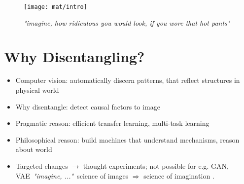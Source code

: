 \begin{figure}[t] \centering \texttt{[image: mat/intro]} \caption{\textit{"imagine, how ridiculous you would look, if you wore that hot pants"}} \label{fig:x4} \end{figure}

\section*{Why Disentangling?} \begin{itemize} \item Computer vision: automatically discern patterns, that reflect structures in physical world \item Why disentangle: detect causal factors to image \item Pragmatic reason: efficient transfer learning, multi-task learning \item Philosophical reason: build machines that understand mechanisms, reason about world \cite{Pearl:2018im} \item Targeted changes $\rightarrow$ thought experiments; not possible for e.g. GAN, VAE\ \textit{"imagine, ..."}\ science of images $\Rightarrow$ science of imagination \cite{Mahadevan:2018tz}. \end{itemize}



